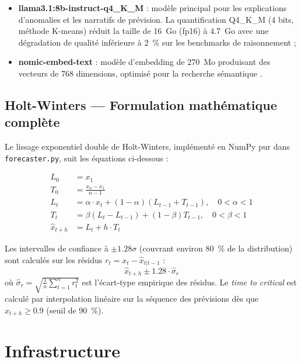 \begin{itemize}
  \item \textbf{llama3.1:8b-instruct-q4\_K\_M} : modèle principal pour les
    explications d'anomalies et les narratifs de prévision. La quantification
    Q4\_K\_M (4 bits, méthode K-means) réduit la taille de 16~Go (fp16)
    à 4.7~Go avec une dégradation de qualité inférieure à 2~\% sur les
    benchmarks de raisonnement \cite{dettmers2022quantization} ;
  \item \textbf{nomic-embed-text} : modèle d'embedding de 270~Mo produisant
    des vecteurs de 768 dimensions, optimisé pour la recherche sémantique
    \cite{nomicembed2024}.
\end{itemize}

\subsection{Holt-Winters — Formulation mathématique complète}

Le lissage exponentiel double de Holt-Winters, implémenté en NumPy pur dans
\texttt{forecaster.py}, suit les équations ci-dessous :

\begin{align}
  L_0 &= x_1 \tag{initialisation du niveau} \\
  T_0 &= \frac{x_n - x_1}{n-1} \tag{initialisation de la tendance} \\[6pt]
  L_t &= \alpha \cdot x_t + (1-\alpha)(L_{t-1} + T_{t-1}),
        \quad 0 < \alpha < 1 \tag{mise à jour du niveau} \\[4pt]
  T_t &= \beta(L_t - L_{t-1}) + (1-\beta)T_{t-1},
        \quad 0 < \beta < 1 \tag{mise à jour de la tendance} \\[4pt]
  \hat{x}_{t+h} &= L_t + h \cdot T_t \tag{prévision à h pas}
\end{align}

\noindent Les intervalles de confiance à $\pm 1.28\sigma$ (couvrant environ 80~\%
de la distribution) sont calculés sur les résidus $r_t = x_t - \hat{x}_{t|t-1}$ :
\begin{equation}
  \hat{x}_{t+h} \pm 1.28 \cdot \hat{\sigma}_r
\end{equation}
où $\hat{\sigma}_r = \sqrt{\frac{1}{n}\sum_{t=1}^{n} r_t^2}$ est l'écart-type
empirique des résidus. Le \textit{time to critical} est calculé par interpolation
linéaire sur la séquence des prévisions dès que $\hat{x}_{t+h} \geq 0.9$ (seuil
de 90~\%).

\section{Infrastructure}

